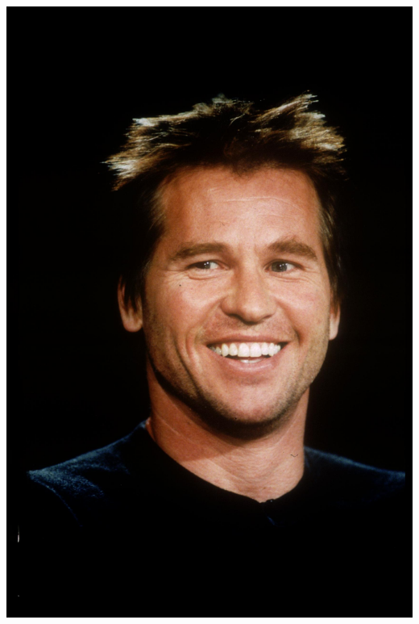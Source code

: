 \documentclass{beamer}
\begin{document}
\begin{frame}[fragile]
\begin{itemize}
\includegraphics[height=0.3\textheight]{val.jpg} 
\end{itemize}
\end{frame}
\end{document}
